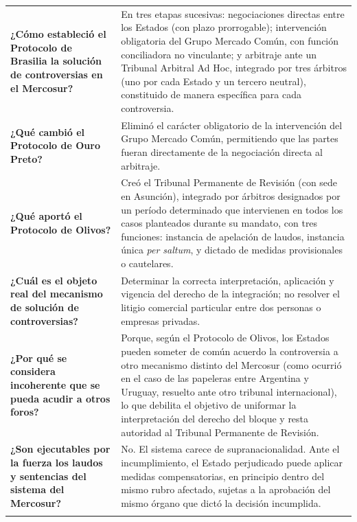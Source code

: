 \documentclass[12pt,oneside]{book}
\begin{document}
\begin{longtable}{
    >{\raggedright\arraybackslash}p{}
    >{\raggedright\arraybackslash}X
}
\textbf{¿Cómo estableció el Protocolo de Brasilia la solución de controversias en el Mercosur?} &
En tres etapas sucesivas: negociaciones directas entre los Estados (con plazo prorrogable); intervención obligatoria del Grupo Mercado Común, con función conciliadora no vinculante; y arbitraje ante un Tribunal Arbitral Ad Hoc, integrado por tres árbitros (uno por cada Estado y un tercero neutral), constituido de manera específica para cada controversia. \\
\addlinespace

\textbf{¿Qué cambió el Protocolo de Ouro Preto?} &
Eliminó el carácter obligatorio de la intervención del Grupo Mercado Común, permitiendo que las partes fueran directamente de la negociación directa al arbitraje. \\
\addlinespace

\textbf{¿Qué aportó el Protocolo de Olivos?} &
Creó el Tribunal Permanente de Revisión (con sede en Asunción), integrado por árbitros designados por un período determinado que intervienen en todos los casos planteados durante su mandato, con tres funciones: instancia de apelación de laudos, instancia única \textit{per saltum}, y dictado de medidas provisionales o cautelares. \\
\addlinespace

\textbf{¿Cuál es el objeto real del mecanismo de solución de controversias?} &
Determinar la correcta interpretación, aplicación y vigencia del derecho de la integración; no resolver el litigio comercial particular entre dos personas o empresas privadas. \\
\addlinespace

\textbf{¿Por qué se considera incoherente que se pueda acudir a otros foros?} &
Porque, según el Protocolo de Olivos, los Estados pueden someter de común acuerdo la controversia a otro mecanismo distinto del Mercosur (como ocurrió en el caso de las papeleras entre Argentina y Uruguay, resuelto ante otro tribunal internacional), lo que debilita el objetivo de uniformar la interpretación del derecho del bloque y resta autoridad al Tribunal Permanente de Revisión. \\
\addlinespace

\textbf{¿Son ejecutables por la fuerza los laudos y sentencias del sistema del Mercosur?} &
No. El sistema carece de supranacionalidad. Ante el incumplimiento, el Estado perjudicado puede aplicar medidas compensatorias, en principio dentro del mismo rubro afectado, sujetas a la aprobación del mismo órgano que dictó la decisión incumplida. \\
\addlinespace


\end{longtable}
\end{document}
